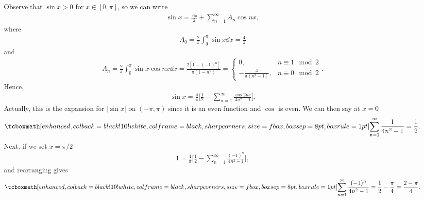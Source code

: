 Observe that $\sin{x} > 0$ for $x \in [0,\pi]$, so we can write
\begin{eqnarray}
    \label{eq:cosine-series-4}
    \sin{x} = \frac{A_0}{2} + \sum_{n=1}^{\infty} A_{n}\cos{n x}
,\end{eqnarray}
where 
\begin{eqnarray}
    \label{eq:A0-coeff-4}
    A_0 = \frac{2}{\pi} \int_{0}^{\pi} \sin{x} \dd{x} = \frac{4}{\pi} 
\end{eqnarray}
and
\begin{eqnarray}
    \label{eq:An-coeff-4}
    A_{n} = \frac{2}{\pi} \int_{0}^{\pi} \sin{x} \cos{nx} \dd{x} = \frac{2[1 - (-1)^{n}]}{\pi(1 - n^2)} = 
    \begin{cases}
        0, & n \equiv 1 \mod{2} \\
        -\frac{4}{\pi(n^2 - 1)}, & n \equiv 0 \mod{2}
    \end{cases}
.\end{eqnarray}
Hence,
\begin{eqnarray}
    \label{eq:sine-fourier}
    \sin{x} = \frac{4}{\pi}\Bigg[ \frac{1}{2} - \sum_{n=1}^{\infty} \frac{\cos{2nx}}{4n^2 - 1} \Bigg]
.\end{eqnarray}
Actually, this is the expansion for $|\sin{x}|$ on $(-\pi,\pi)$ since it is an even function and $\cos$ is even.
We can then say at $x = 0$
\begin{eqnarray}
    \label{eq:sum1}
    \eqbox{
    \sum_{n=1}^{\infty} \frac{1}{4n^2-1} = \frac{1}{2}
}
.\end{eqnarray}
Next, if we set $x = \pi/2$
\begin{eqnarray}
    \label{eq:sum2}
    1 = \frac{4}{\pi}\Bigg[ \frac{1}{2} - \sum_{n=1}^{\infty} \frac{(-1)^{n}}{4n^2 - 1} \Bigg] 
,\end{eqnarray}
and rearranging gives
\begin{eqnarray}
    \label{eq:sum2-sol}
    \eqbox{
    \sum_{n=1}^{\infty} \frac{(-1)^{n}}{4n^2 - 1} = \frac{1}{2} - \frac{\pi}{4} = \frac{2 - \pi}{4}
}
.\end{eqnarray}








